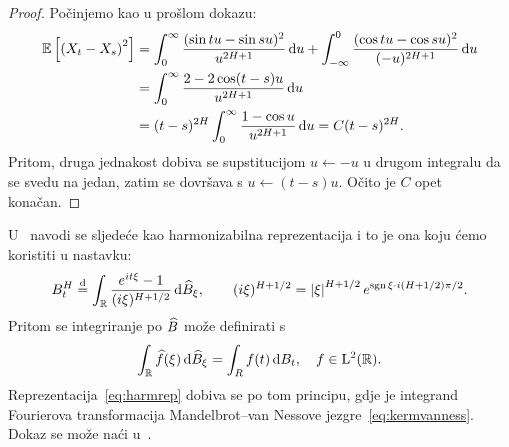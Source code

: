 \documentclass[main.tex]{subfiles}
\begin{document}
\begin{proof}
	Počinjemo kao u prošlom dokazu:
	\begin{align}
		\mathbb{E} \left[ \left( X_t-X_s \right)^2 \right] & =
		\int_0^\infty \frac{(\sin tu - \sin su)^2}{u^{2H+1}} \,\mathrm d u +
		\int_{-\infty}^0 \frac{(\cos tu - \cos su)^2}{(-u)^{2H+1}} \,\mathrm d u                                  \\
		                                           & = \int_0^\infty \frac{2-2\cos(t-s)u}{u^{2H+1}} \,\mathrm d u \\ &=  (t-s)^{2H}\int_0^\infty \frac{1-\cos u}{u^{2H+1}} \,\mathrm d u =C(t-s)^{2H}.
	\end{align}
	Pritom, druga jednakost dobiva se supstitucijom \( u \leftarrow -u \)
	u drugom integralu da se svedu na jedan, zatim se
	dovršava s \( u \leftarrow (t-s)u \). Očito je \( C \) opet konačan.
\end{proof}

\begin{komentar}\label{kom:harmrep}
	U~\cite{ayache} navodi se sljedeće kao harmonizabilna reprezentacija i to
	je ona koju ćemo koristiti u nastavku:
	\begin{equation}\label{eq:harmrep}
		B^H_t \stackrel{\mathrm d}{=}
		\int_{\mathbb{R}} \frac{e^{it\xi}-1}{(i\xi)^{H+1/2}} \,\mathrm d \widehat{B}_\xi,
		\qquad
		(i\xi)^{H+1/2} = \left| {\xi} \right|^{H+1/2}e^{\operatorname{sgn}\xi \cdot i(H+1/2)\pi/2}.
	\end{equation}
	Pritom se integriranje po \( \widehat{B} \) može definirati s
	\begin{equation}
		\int_{\mathbb{R}} \widehat{f}(\xi) \,\mathrm d \widehat{B} _\xi = \int_R f(t) \,\mathrm d B_t, \quad
		f \in \mathrm{L}^2(\mathbb{R}).
	\end{equation}
	Reprezentacija~\eqref{eq:harmrep} dobiva se po tom principu,
	gdje je integrand Fourierova transformacija Mandelbrot--van Nessove jezgre~\eqref{eq:kermvanness}.
	Dokaz se može naći u~\cite{pipiras}.
\end{komentar}
\end{document}

